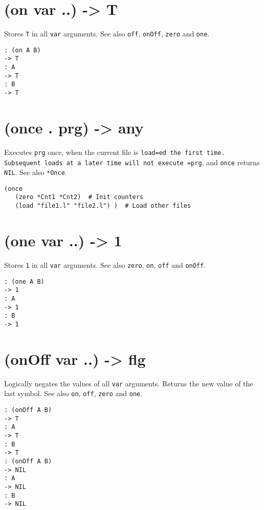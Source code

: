 {{{{{{{ 
\section{(on var ..) -> T}
\label{sec-8-1-15-8}


Stores \texttt{T} in all \texttt{var} arguments. See also \texttt{off}, \texttt{onOff}, \texttt{zero} and
\texttt{one}.


\begin{verbatim}
: (on A B)
-> T
: A
-> T
: B
-> T
\end{verbatim}

 
\section{(once . prg) -> any}
\label{sec-8-1-15-9}


Executes \texttt{prg} once, when the current file is \texttt{load=ed the first time. Subsequent loads at a later time will not execute =prg}, and \texttt{once}
returns \texttt{NIL}. See also \texttt{*Once}.


\begin{verbatim}
(once
   (zero *Cnt1 *Cnt2)  # Init counters
   (load "file1.l" "file2.l") )  # Load other files
\end{verbatim}

 
\section{(one var ..) -> 1}
\label{sec-8-1-15-10}


Stores \texttt{1} in all \texttt{var} arguments. See also \texttt{zero}, \texttt{on}, \texttt{off} and
\texttt{onOff}.


\begin{verbatim}
: (one A B)
-> 1
: A
-> 1
: B
-> 1
\end{verbatim}

 
\section{(onOff var ..) -> flg}
\label{sec-8-1-15-11}


Logically negates the values of all \texttt{var} arguments. Returns the new
value of the last symbol. See also \texttt{on}, \texttt{off}, \texttt{zero} and \texttt{one}.


\begin{verbatim}
: (onOff A B)
-> T
: A
-> T
: B
-> T
: (onOff A B)
-> NIL
: A
-> NIL
: B
-> NIL
\end{verbatim}

}}}}}}}
